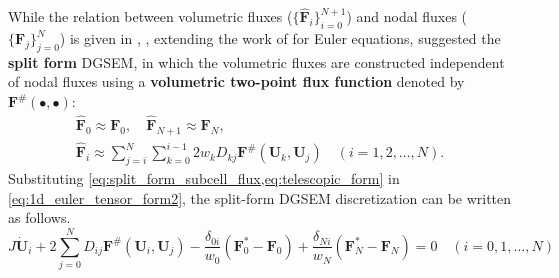 \documentclass[a4paper,11pt,oneside]{article}
\newcommand{\newword}[1]{\textbf{#1}} %
\newcommand{\citear}[1]{\citeauthor{#1} \cite{#1}} %
\newcommand{\vect}[1]{\ensuremath{\boldsymbol{\mathbf{#1}}}} %
\newcommand{\eulerref}[1]{\ensuremath{#1}} %
\begin{document}
While the relation between volumetric fluxes ($\{\hat{\vect{\eulerref{F}}}_i\}_{i=0}^{N+1}$) and nodal fluxes ($\{\vect{\eulerref{F}}_j\}_{j=0}^{N}$) is given in \cite{fisherCarpenterNordstrom2013}, \citear{gassnerWintersKopriva2016}, extending the work of \citear{fisherCarpenter2013} for Euler equations, suggested the \newword{split form} DGSEM, in which the volumetric fluxes are constructed independent of nodal fluxes using a \newword{volumetric two-point flux function} denoted by $\vect{\eulerref{F}}^\#(\bullet, \bullet)$:
\begin{equation}
	\begin{gathered}
		\hat{\vect{\eulerref{F}}}_0 \approx \vect{\eulerref{F}}_0, \quad \hat{\vect{\eulerref{F}}}_{N+1} \approx \vect{\eulerref{F}}_N,\\
		\hat{\vect{\eulerref{F}}}_i \approx \sum_{j=i}^{N} \sum_{k=0}^{i-1} 2 w_k D_{kj} \vect{\eulerref{F}}^\#(\vect{\eulerref{U}}_k, \vect{\eulerref{U}}_j)\quad (i=1,2,\ldots,N).
	\end{gathered}
	\label{eq:split_form_subcell_flux}
\end{equation}
Substituting \cref{eq:split_form_subcell_flux,eq:telescopic_form} in \cref{eq:1d_euler_tensor_form2}, the split-form DGSEM discretization can be written as follows.
\begin{equation}
	J \dot{\vect{\eulerref{U}}}_i + 2\sum_{j=0}^{N} D_{ij} \vect{\eulerref{F}}^\#(\vect{\eulerref{U}}_i, \vect{\eulerref{U}}_j) - \frac{\delta_{0i}}{w_0} \left( \vect{\eulerref{F}}^*_0 - \vect{\eulerref{F}}_0 \right) + \frac{\delta_{Ni}}{w_N} \left( \vect{\eulerref{F}}^*_N - \vect{\eulerref{F}}_N \right) = 0 \quad (i=0,1,\ldots,N)
	\label{eq:1d_euler_tensor_form3}
\end{equation}
\end{document}

